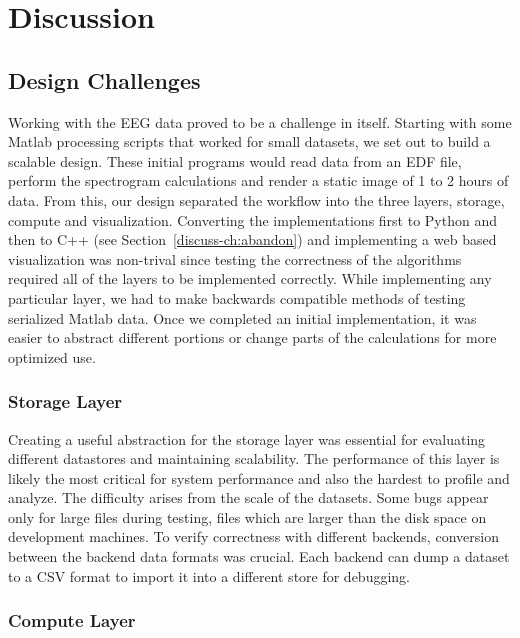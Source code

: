 \chapter{Discussion}\label{discuss-ch}

\section{Design Challenges}

Working with the EEG data proved to be a challenge in itself. Starting with
some Matlab processing scripts that worked for small datasets, we set out to
build a scalable design. These initial programs would read data from an EDF
file, perform the spectrogram calculations and render a static image of 1 to 2
hours of data. From this, our design separated the workflow into the three
layers, storage, compute and visualization. Converting the implementations
first to Python and then to C++ (see Section~\ref{discuss-ch:abandon}) and
implementing a web based visualization was non-trival since testing the
correctness of the algorithms required all of the layers to be implemented
correctly. While implementing any particular layer, we had to make backwards
compatible methods of testing serialized Matlab data. Once we completed an
initial implementation, it was easier to abstract different portions or change
parts of the calculations for more optimized use. \\

\subsection{Storage Layer}

Creating a useful abstraction for the storage layer was essential for
evaluating different datastores and maintaining scalability. The performance of
this layer is likely the most critical for system performance and also the
hardest to profile and analyze. The difficulty arises from the scale of the
datasets. Some bugs appear only for large files during testing, files which are
larger than the disk space on development machines. To verify correctness with
different backends, conversion between the backend data formats was crucial.
Each backend can dump a dataset to a CSV format to import it into a different
store for debugging.

\subsection{Compute Layer}

